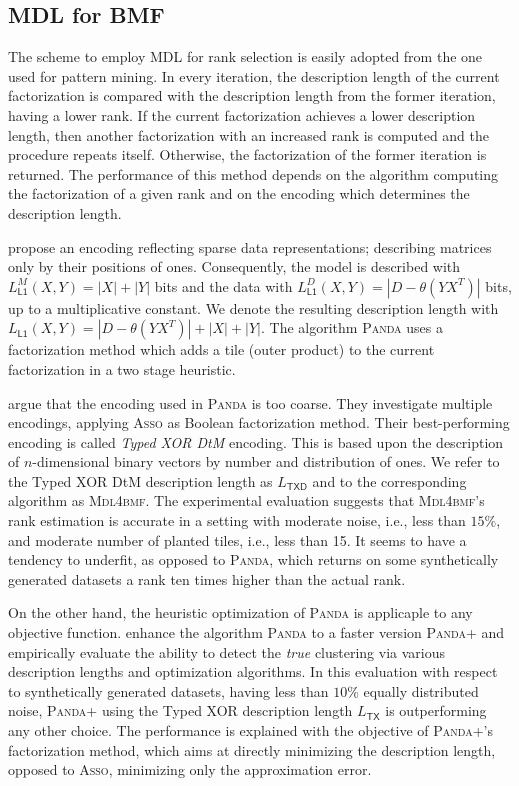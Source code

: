 \subsection{MDL for BMF}
The scheme to employ MDL for rank selection is easily adopted from the one used for pattern mining. 
In every iteration, the description length of the current factorization is compared with the description length from the former iteration, having a lower rank. If the current factorization achieves a lower description length, then another factorization with an increased rank is computed and the procedure repeats itself. Otherwise, the factorization of the former iteration is returned. The performance of this method depends on the algorithm computing the factorization of a given rank and on the encoding which determines the description length.

\cite{lucchese2010noise} propose an encoding reflecting sparse data representations; describing matrices only by their positions of ones. Consequently, the model is described with $L^M_{\mathsf{L1}}(X,Y)=|X|+|Y|$ bits and the data with $L^D_{\mathsf{L1}}(X,Y)=|D-\theta(YX^T)|$ bits, up to a multiplicative constant. We denote the resulting description length with $L_{\mathsf{L1}}(X,Y)=|D-\theta(YX^T)|+|X|+|Y|$. The algorithm \textsc{Panda} uses a factorization method which adds a tile (outer product) to the current factorization in a two stage heuristic. 
 
\cite{miettinen2014mdl4bmf} argue that the encoding used in \textsc{Panda} is too coarse. They investigate multiple encodings, applying \textsc{Asso} as Boolean factorization method. Their best-performing encoding is called \emph{Typed XOR DtM} encoding. This is based upon the description of $n$-dimensional binary vectors by number and distribution of ones. 
We refer to  the Typed XOR DtM description length as $L_{\mathsf{TXD}}$ and to the corresponding algorithm as \textsc{Mdl4bmf}. The experimental evaluation suggests that \textsc{Mdl4bmf}'s rank estimation is accurate in a setting with moderate noise, i.e., less than $15\%$, and moderate number of planted tiles, i.e., less than 15. It seems to have a tendency to underfit, as opposed to \textsc{Panda}, which returns on some synthetically generated datasets a rank ten times higher than the actual rank.

On the other hand, the heuristic optimization of \textsc{Panda} is applicaple to any objective function. \cite{lucchese2014unifying} enhance the algorithm \textsc{Panda} to a faster version \textsc{Panda+} and empirically evaluate the ability to detect the \emph{true} clustering via various description lengths and optimization algorithms. In this evaluation with respect to synthetically generated datasets, having less than $10\%$ equally distributed noise, \textsc{Panda+} using the Typed XOR description length $L_{\mathsf{TX}}$ is outperforming any other choice. The performance is explained with the objective of \textsc{Panda+}'s factorization method, which aims at directly minimizing the description length, opposed to \textsc{Asso}, minimizing only the approximation error.

